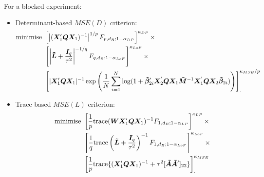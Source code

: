 For a blocked experiment:
\begin{itemize}
\item Determinant-based $MSE(D)$ criterion:
\begin{align}
\label{eq::MSE_D_B_ms}
\mbox{minimise }&\left[\left|(\bm{X}'_{1}\bm{Q}\bm{X}_{1})^{-1}\right|^{1/p}F_{p,d_B;1-\alpha_{DP}}\right]^{\kappa_{DP}} \times \notag \\ &\left[\left|\bm{\tilde{L}}+\frac{\bm{I}_{q}}{\tau^{2}}\right|^{-1/q}F_{q,d_B;1-\alpha_{LoF}}\right]^{\kappa_{LoF}}\times \notag\\ & \left[|\bm{X}'_{1}\bm{QX}_{1}|^{-1}\exp\left(\frac{1}{N}\sum_{i=1}^{N}\log(1+\bm{\tilde{\beta}}_{2i}'\bm{X}_2^{'}\bm{QX}_1\bm{\tilde{M}}^{-1}\bm{X}_1^{'}\bm{QX}_2\bm{\tilde{\beta}}_{2i})\right)\right]_{.}^{\kappa_{MSE}/p}
\end{align}
\item Trace-based $MSE(L)$ criterion:
\begin{align}
\label{eq::MSE_L_B_ms}
\mbox{minimise }&\left[\frac{1}{p}\mbox{trace}(\bm{WX}'_{1}\bm{Q}\bm{X}_{1})^{-1}F_{1,d_B;1-\alpha_{LP}}\right]^{\kappa_{LP}}\times \notag \\&\left[\frac{1}{q}\mbox{trace}\left(\bm{\tilde{L}}+\frac{\bm{I}_{q}}{\tau^{2}}\right)^{-1}F_{1,d_B;1-\alpha_{LoF}}\right]^{\kappa_{LoF}}\times \notag \\& \left[\frac{1}{p}\mbox{trace}\{(\bm{X}'_{1}\bm{QX}_{1})^{-1}+\tau^2[\bm{\tilde{A}}\bm{\tilde{A}}']_{22}\}\right]^{\kappa_{MSE}}_{.}
\end{align}
\end{itemize} 

